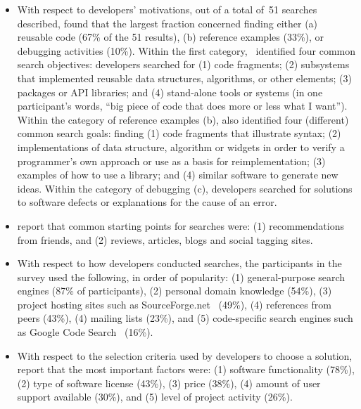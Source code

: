 \documentclass[review]{elsarticle}
\begin{document}
\begin{itemize}

\item With respect to developers' motivations, out of a total of~51 searches described, \citeauthor{umarji_2008} found that the largest fraction concerned finding either (a) reusable code (67\% of the 51 results), (b) reference examples (33\%), or debugging activities (10\%).  Within the first category,  \citeauthor{umarji_2008}\ identified four common search objectives: developers searched for (1) code fragments; (2) subsystems that implemented reusable data structures, algorithms, or other elements; (3) packages or API libraries; and (4) stand-alone tools or systems (in one participant's words, ``big piece of code that does more or less what I want'').  Within the category of reference examples (b), \citeauthor{umarji_2008} also identified four (different) common search goals: finding (1)  code fragments that illustrate syntax; (2) implementations of data structure, algorithm or widgets in order to verify a programmer's own approach or use as a basis for reimplementation; (3) examples of how to use a library; and (4) similar software to generate new ideas.  Within the category of debugging (c), developers searched for solutions to software defects or explanations for the cause of an error.

\item \citet{umarji_2013} report that common starting points for searches were: (1) recommendations from friends, and (2) reviews, articles, blogs and social tagging sites.

\item With respect to how developers conducted searches, the participants in the survey used the following, in order of popularity: (1) general-purpose search engines (87\% of participants), (2) personal domain knowledge (54\%), (3) project hosting sites such as SourceForge.net~\citep{sourceforge_1999} (49\%), (4) references from peers (43\%), (4) mailing lists (23\%), and (5) code-specific search engines such as Google Code Search~\citep{googlecodesearch_2006} (16\%).

\item With respect to the selection criteria used by developers to choose a solution, \citet{umarji_2013} report that the most important factors were: (1) software functionality (78\%), (2) type of software license (43\%), (3) price (38\%), (4) amount of user support available (30\%), and (5) level of project activity (26\%).

\end{itemize}
\end{document}
